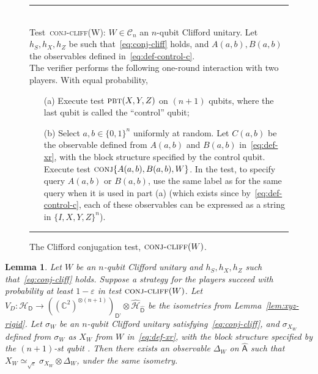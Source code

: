 \documentclass[11pt]{article}
\newtheorem{lemma}[theorem]{Lemma}
\theoremstyle{remark}
\theoremstyle{definition}
\newcommand{\reg}[1]{{\textsf{#1}}}
\newcommand{\C}{\ensuremath{\mathbb{C}}}
\newcommand{\mH}{\mathcal{H}}
\newcommand{\eps}{\varepsilon}
\newcommand{\pbt}{\textsc{pbt}}
\newcommand{\conj}{\textsc{conj}}
\newcommand{\perm}{\textsc{tens}}
\newcommand{\conjc}{\textsc{conj-cliff}}
\begin{document}
\begin{figure}[H]
\rule[1ex]{16.5cm}{0.5pt}\\
Test~\conjc(W): $W \in \mathcal{C}_n$ an $n$-qubit Clifford unitary. Let $h_S,h_X,h_Z$ be such that~\eqref{eq:conj-cliff} holds, and $A(a,b),B(a,b)$ the observables defined in~\eqref{eq:def-control-c}. \\
The verifier performs the following one-round interaction with two
players. With equal probability,
\begin{enumerate}
\item[(a)] Execute test $\pbt(X,Y,Z)$ on $(n+1)$ qubits, where the last qubit is called the ``control'' qubit;
\item[(b)] Select $a,b\in\{0,1\}^n$ uniformly at random. Let $C(a,b)$ be the observable defined from $A(a,b)$ and $B(a,b)$ in~\eqref{eq:def-xr}, with the block structure specified by the control qubit. Execute test $\conj\{A(a,b),B(a,b),W\}$. In the test, to specify query $A(a,b)$ or $B(a,b)$, use the same label as for the same query when it is used in part (a) (which exists since by~\eqref{eq:def-control-c}, each of these observables can be expressed as a string in $\{I,X,Y,Z\}^n$).
\end{enumerate}
\rule[2ex]{16.5cm}{0.5pt}\vspace{-1cm}
\caption{The Clifford conjugation test, $\conjc(W)$.}
\label{fig:conjugation-test-2}
\end{figure}


\begin{lemma}\label{lem:cliff-conj}
Let $W$ be an $n$-qubit Clifford unitary and $h_S,h_X,h_Z$ such that~\eqref{eq:conj-cliff} holds. Suppose a strategy for the players succeed with probability at least $1-\eps$ in test $\conjc(W)$. Let $V_D:\mH_\reg{D} \to ((\C^2)^{\otimes (n+1)})_{\reg{D'}}  \otimes \hat{\mH}_{\hat{\reg{D}}}$ be the isometries from Lemma~\ref{lem:xyz-rigid}.  Let $\sigma_W$ be an $n$-qubit Clifford unitary satisfying~\eqref{eq:conj-cliff}, and $\sigma_{X_W}$ defined from $\sigma_W$ as $X_W$ from $W$ in~\eqref{eq:def-xr}, with the block structure specified by the $(n+1)$-st qubit . Then there exists an observable $\Delta_W$ on $\hat{\reg{A}}$ such that $X_W \simeq_{\sqrt{\eps}} \sigma_{X_W}\otimes \Delta_W$, under the same isometry.  
\end{lemma}
\end{document}

